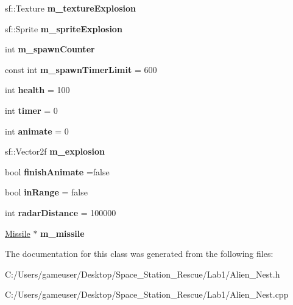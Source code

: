 \begin{DoxyCompactItemize}
sf\+::\+Texture {\bfseries m\+\_\+texture\+Explosion}
\item 
\mbox{\label{class_alien___nest_a34b67cfb4ef9ebabb5f6f282c9cb173f}} 
sf\+::\+Sprite {\bfseries m\+\_\+sprite\+Explosion}
\item 
\mbox{\label{class_alien___nest_a94f70503efac5979e6505a38b77ecb0b}} 
int {\bfseries m\+\_\+spawn\+Counter}
\item 
\mbox{\label{class_alien___nest_a30bc0c5b936c0f58394d604480ae8da6}} 
const int {\bfseries m\+\_\+spawn\+Timer\+Limit} = 600
\item 
\mbox{\label{class_alien___nest_aa722384f6f0711d010e88be41caff779}} 
int {\bfseries health} = 100
\item 
\mbox{\label{class_alien___nest_aa71753d64d1035e1dee8769bf3a1e2f9}} 
int {\bfseries timer} = 0
\item 
\mbox{\label{class_alien___nest_a7fb338ef35b3920745006082d7dc18a7}} 
int {\bfseries animate} = 0
\item 
\mbox{\label{class_alien___nest_adb2e1cdef0aefe61acfc499537ee9da2}} 
sf\+::\+Vector2f {\bfseries m\+\_\+explosion}
\item 
\mbox{\label{class_alien___nest_a9cb127802460789d22974795192ebfc3}} 
bool {\bfseries finish\+Animate} =false
\item 
\mbox{\label{class_alien___nest_ab85938cac3e9c04f359ccb797c8a0bbe}} 
bool {\bfseries in\+Range} = false
\item 
\mbox{\label{class_alien___nest_aa02bfcffc5882dc93edf80e4b34013ca}} 
int {\bfseries radar\+Distance} = 100000
\item 
\mbox{\label{class_alien___nest_aaa8717a866ff7add88b145fab7455cb9}} 
\mbox{\hyperlink{class_missile}{Missile}} $\ast$ {\bfseries m\+\_\+missile}
\end{DoxyCompactItemize}


The documentation for this class was generated from the following files\+:\begin{DoxyCompactItemize}
\item 
C\+:/\+Users/gameuser/\+Desktop/\+Space\+\_\+\+Station\+\_\+\+Rescue/\+Lab1/Alien\+\_\+\+Nest.\+h\item 
C\+:/\+Users/gameuser/\+Desktop/\+Space\+\_\+\+Station\+\_\+\+Rescue/\+Lab1/Alien\+\_\+\+Nest.\+cpp\end{DoxyCompactItemize}
